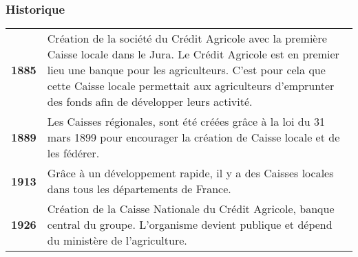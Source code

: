 \documentclass[12pt,a4paper]{article}
\begin{document}
\subsubsection{Historique}
\begin{tabular}{lp{15.5cm}}
\textbf{1885} & Création de la société du Crédit Agricole avec la première Caisse locale dans le Jura. Le Crédit Agricole est en premier lieu une banque pour les agriculteurs. C'est pour cela que cette Caisse locale permettait aux agriculteurs d'emprunter des fonds afin de développer leurs activité.\medskip \\
\textbf{1889} & Les Caisses régionales, sont été créées grâce à la loi du 31 mars 1899 pour encourager la création de Caisse locale et de les fédérer.\medskip \\
\textbf{1913} & Grâce à un développement rapide, il y a des Caisses locales dans tous les départements de France.\medskip \\
\textbf{1926} & Création de la Caisse Nationale du Crédit Agricole, banque central du groupe. L'organisme devient publique et dépend du ministère de l'agriculture.\medskip \\
\end{tabular}
\end{document}
